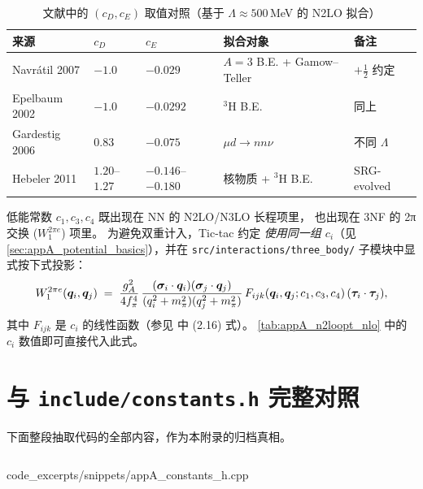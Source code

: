 \begin{table}[htbp]
\centering
\caption{文献中的 $(c_D, c_E)$ 取值对照（基于 $\Lambda \approx 500$\,\si{MeV} 的 N2LO 拟合）}
\label{tab:appA_cD_cE_table}
\begin{tabular}{@{}lllll@{}}
\toprule
来源 & $c_D$ & $c_E$ & 拟合对象 & 备注 \\
\midrule
Navrátil 2007\cite{Navratil2007} & $-1.0$ & $-0.029$ & $A=3$ B.E. + Gamow–Teller & $+\tfrac{1}{2}$ 约定 \\
Epelbaum 2002\cite{Epelbaum2002NLO3NF} & $-1.0$ & $-0.0292$ & $^3\mathrm{H}$ B.E. & 同上 \\
Gardestig 2006 & $0.83$ & $-0.075$ & $\mu d \to nn\nu$ & 不同 $\Lambda$ \\
Hebeler 2011 & $1.20$–$1.27$ & $-0.146$–$-0.180$ & 核物质 + ${}^3\mathrm{H}$ B.E. & SRG-evolved \\
\bottomrule
\end{tabular}
\end{table}

低能常数 $c_1, c_3, c_4$ 既出现在 NN 的 N2LO/N3LO 长程项里，
也出现在 3NF 的 2π 交换 ($W_1^{2\pi e}$) 项里。
为避免双重计入，Tic-tac 约定 \emph{使用同一组 $c_i$}（见
\cref{sec:appA_potential_basics}），并在 \texttt{src/interactions/three\_body/}
子模块中显式按下式投影：
\begin{equation}
W_1^{2\pi e}(\bm{q}_i, \bm{q}_j) \;=\;
\frac{g_A^2}{4 f_\pi^4}\,
\frac{(\bm{\sigma}_i\cdot\bm{q}_i)(\bm{\sigma}_j\cdot\bm{q}_j)}
     {(q_i^2+m_\pi^2)(q_j^2+m_\pi^2)}\,
F_{ijk}(\bm{q}_i, \bm{q}_j; c_1, c_3, c_4)\,
(\bm{\tau}_i\cdot\bm{\tau}_j),
\label{eq:appA_W1_2pe}
\end{equation}
其中 $F_{ijk}$ 是 $c_i$ 的线性函数（参见 \cite{Epelbaum2002NLO3NF} 中 (2.16) 式）。
\cref{tab:appA_n2loopt_nlo} 中的 $c_i$ 数值即可直接代入此式。

\section{与 \texttt{include/constants.h} 完整对照}
\label{sec:appA_constants_h}

下面整段抽取代码的全部内容，作为本附录的归档真相。
\begin{lstlisting}[style=cpp, caption={\texttt{include/constants.h} 完整内容}, label={lst:appA_constants_h}]
\end{lstlisting}

                {code_excerpts/snippets/appA_constants_h.cpp}

